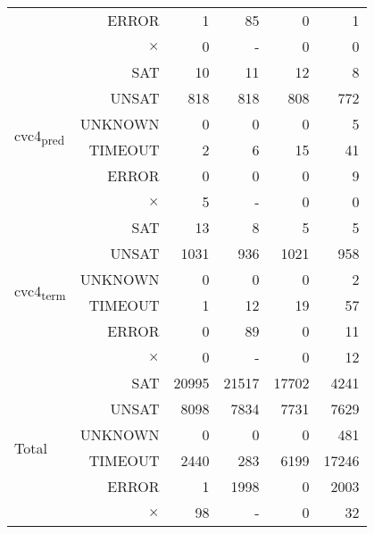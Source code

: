 \documentclass[12pt]{article}
\begin{document}
\begin{table}[h]
{\begin{tabular}{|l r | r r r r |}
							& ERROR    &      1  &    85 &     0 &     1 \\
							& $\times$ &      0  &     - &     0 &     0 \\\hline
\multirow{6}{*}{cvc4\textsubscript{pred}} & SAT & 10 & 11 &   12 &     8 \\
							& UNSAT    &    818  &   818 &   808 &   772 \\
							& UNKNOWN  &      0  &     0 &     0 &     5 \\
							& TIMEOUT  &      2  &     6 &    15 &    41 \\
							& ERROR    &      0  &     0 &     0 &     9 \\
							& $\times$ &      5  &     - &     0 &     0 \\ \hline
\multirow{6}{*}{cvc4\textsubscript{term}} & SAT & 13 & 8 &     5 &     5 \\
							& UNSAT    &   1031  &   936 &  1021 &   958 \\
							& UNKNOWN  &      0  &     0 &     0 &     2 \\
							& TIMEOUT  &      1  &    12 &    19 &    57 \\
							& ERROR    &      0  &    89 &     0 &    11 \\
							& $\times$ &      0  &     - &     0 &    12 \\ \hline \hline
\multirow{6}{*}{Total} 		& SAT      &  20995  & 21517 & 17702 &  4241 \\
							& UNSAT    &   8098  &  7834 &  7731 &  7629 \\
							& UNKNOWN  &      0  &     0 &     0 &   481 \\
							& TIMEOUT  &   2440  &   283 &  6199 & 17246 \\
							& ERROR    &      1  &  1998 &     0 &  2003 \\
							& $\times$ &     98  &     - &     0 &    32 \\\hline	
\end{tabular}}
\label{table:base_benchmark}
\end{table}
\end{document}

